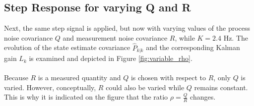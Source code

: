 \documentclass[a4paper,kul]{kulakarticle} %
\begin{document}
\subsection{Step Response for varying Q and R}
Next, the same step signal is applied, but now with varying values of the process noise covariance $Q$ and measurement noise covariance $R$, while $K = 2.4$ Hz. The evolution of the state estimate covariance $\hat{P}_{k|k}$ and the corresponding Kalman gain $L_k$ is examined and depicted in Figure \ref{fig:variable_rho}. 
\\\\
Because $R$ is a measured quantity and $Q$ is chosen with respect to $R$, only $Q$ is varied. However, conceptually, $R$ could also be varied while $Q$ remains constant. This is why it is indicated on the figure that the ratio $\rho = \frac{Q}{R}$ changes.
\end{document}
